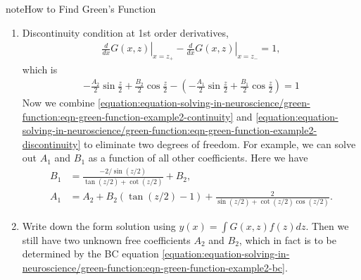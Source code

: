 \documentclass[letterpaper,10pt,english]{sphinxmanual}
\begin{document}
\begin{sphinxadmonition}{note}{How to Find Green’s Function}
\begin{enumerate}
\begin{equation*}
\end{equation*}
which is exactly
\label{\detokenize{equation-solving-in-neuroscience/green-function:equation-eqn-green-function-example2-continuity}}\begin{equation}\label{equation:equation-solving-in-neuroscience/green-function:eqn-green-function-example2-continuity}
\begin{split}A_1\cos(z/2) + B_1 \sin(z/2) = A_2 \cos(z/2) + B_2\sin(z/2).\end{split}
\end{equation}
\item {} 
Discontinuity condition at 1st order derivatives,
\begin{equation*}
\begin{split}\left.\frac{d}{dx} G(x,z)  \right\vert_{x=z_+} - \left.\frac{d}{dx} G(x,z)  \right\vert_{x=z_-} = 1,\end{split}
\end{equation*}
which is
\label{\detokenize{equation-solving-in-neuroscience/green-function:equation-eqn-green-function-example2-discontinuity}}\begin{equation}\label{equation:equation-solving-in-neuroscience/green-function:eqn-green-function-example2-discontinuity}
\begin{split}-\frac{A_2}{2}\sin\frac{z}{2} + \frac{B_2}{2} \cos\frac{z}{2} - \left( -\frac{A_1}{2}\sin\frac{z}{2} + \frac{B_1}{2}\cos\frac{z}{2} \right) = 1\end{split}
\end{equation}
Now we combine \eqref{equation:equation-solving-in-neuroscience/green-function:eqn-green-function-example2-continuity} and \eqref{equation:equation-solving-in-neuroscience/green-function:eqn-green-function-example2-discontinuity} to eliminate two degrees of freedom. For example, we can solve out \(A_1\) and \(B_1\) as a function of all other coefficients. Here we have
\begin{equation*}
\begin{split}B_1 &= \frac{ - 2/\sin(z/2) }{\tan(z/2) + \cot(z/2)} + B_2 , \\
A_1 &= A_2 + B_2(\tan(z/2)-1) + \frac{2}{\sin(z/2) + \cot(z/2)\cos(z/2)}.\end{split}
\end{equation*}
\item {} 
Write down the form solution using \(y(x) = \int G(x,z) f(z) dz\). Then we still have two unknown free coefficients \(A_2\) and \(B_2\), which in fact is to be determined by the BC equation \eqref{equation:equation-solving-in-neuroscience/green-function:eqn-green-function-example2-bc}.

\end{enumerate}
\end{sphinxadmonition}
\end{document}

